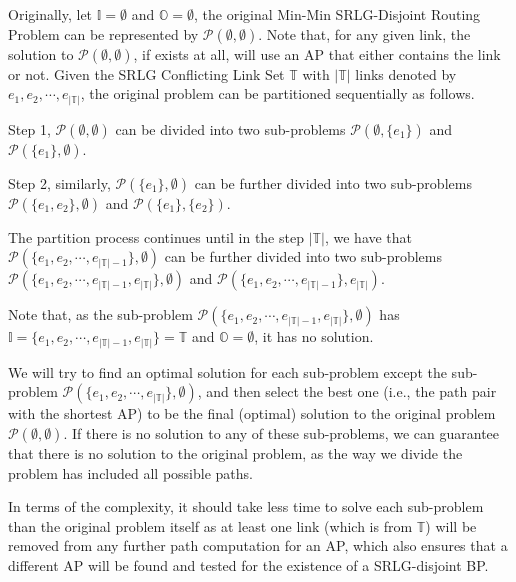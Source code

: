 Originally, let $\mathbb{I}=\emptyset$ and ${\mathbb{O}}=\emptyset$, the original Min-Min  SRLG-Disjoint Routing Problem can be represented by $\mathcal{P}(\emptyset,\emptyset)$. Note that, for any given link, the solution to $\mathcal{P}(\emptyset,\emptyset)$, if  exists at all, will use an AP that either contains the link or not. Given the SRLG Conflicting Link Set $\mathbb{T}$ with $|\mathbb{T}|$ links denoted by ${e_1},{e_2}, \cdots ,{e_{\left| \mathbb{T} \right|}}$, the original problem can be partitioned sequentially as follows.

Step 1, $\mathcal{P}(\emptyset,\emptyset)$ can be  divided into two sub-problems $\mathcal{P}(\emptyset,\{e_1\})$ and $\mathcal{P}(\{e_1\},\emptyset)$.

Step 2, similarly, $\mathcal{P}(\{e_1\},\emptyset)$ can be further divided into two sub-problems $\mathcal{P}(\{e_1,e_2\},\emptyset)$ and $\mathcal{P}(\{e_1\},\{e_2\})$.

The partition process continues until in the step $|\mathbb{T}|$, we have that $\mathcal{P}(\{e_1,e_2,\cdots ,{e_{\left| \mathbb{T} \right|-1}}\},\emptyset)$ can be further divided into two sub-problems $\mathcal{P}(\{e_1,e_2,\cdots ,{e_{\left| \mathbb{T} \right|-1}}, {e_{\left| \mathbb{T} \right|}}\},\emptyset)$ and $\mathcal{P}(\{e_1,e_2,\cdots ,{e_{\left| \mathbb{T} \right|-1}}\},{e_{\left| \mathbb{T} \right|}})$.

Note that, as the sub-problem $\mathcal{P}(\{e_1,e_2,\cdots ,{e_{\left| \mathbb{T} \right|-1}}, {e_{\left| \mathbb{T} \right|}}\},\emptyset)$ has ${\mathbb{I}=\{e_1,e_2,\cdots ,{e_{\left| \mathbb{T} \right|-1}}, {e_{\left| \mathbb{T} \right|}}\}}=\mathbb{T}$ and ${\mathbb{O}}=\emptyset$, it has no solution.

We will try to find an optimal solution for each sub-problem except the sub-problem $\mathcal{P}(\{e_1,e_2,\cdots ,{e_{\left| \mathbb{T} \right|}}\},\emptyset)$, and then select the best one (i.e., the path pair with the shortest AP) to be the final (optimal) solution to the original problem $\mathcal{P}(\emptyset,\emptyset)$. If there is no solution to any of these sub-problems, we can guarantee that there is no solution to the original problem, as the way we divide the problem has included  all possible paths.


In terms of the complexity, it should take less time to solve each sub-problem than the original problem itself as at least one link (which is from $\mathbb{T}$) will be removed from any further path computation for an AP, which also ensures that a different AP will be found and tested for the existence of a SRLG-disjoint BP.


